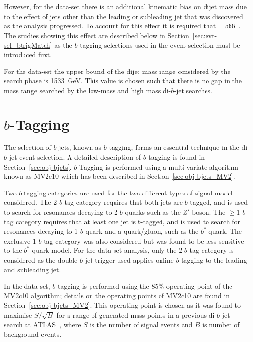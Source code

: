 However, for the \lm{} data-set
there is an additional kinematic bias on dijet mass 
due to the effect of jets other than the leading or subleading jet
that was discovered as the analysis progressed.
To account for this effect it is required that \mjj{}~\gt{}~566~\GeV{}.
The studies showing this effect are described below in Section~\ref{sec:evt-sel_btrigMatch}
as the $b$-tagging selections used in the \lm{} event selection must be introduced first.

For the \lm{} data-set the upper bound of the dijet mass range considered by the search phase is 1533~GeV.
This value is chosen such that there is no gap in the mass range searched by the low-mass and high mass di-$b$-jet searches.

\section{$b$-Tagging}
\label{sec:evt-sel-btag}

The selection of $b$-jets, known as $b$-tagging,
forms an essential technique in the di-$b$-jet event selection.
A detailed description of $b$-tagging is found in Section~\ref{sec:obj-bjets}.
$b$-Tagging is performed using a multi-variate algorithm known as MV2c10 which has been described in Section~\ref{sec:obj-bjets_MV2}.

Two $b$-tagging categories are used for the two different types of signal model considered.
The 2 $b$-tag category requires that both jets are $b$-tagged,
and is used to search for resonances decaying to 2 $b$-quarks such as the $Z'$ boson.
The $\geq 1$ $b$-tag category requires that at least one jet is $b$-tagged,
and is used to search for resonances decaying to 1 $b$-quark and a quark/gluon, such as the $b^*$ quark.
The exclusive 1 $b$-tag category was also considered but was found to be less sensitive to the $b^*$ quark model.
For the \lm{} data-set analysis, only the 2 $b$-tag category is considered
as the double $b$-jet trigger used applies online $b$-tagging to the leading and subleading jet.

In the \summer{} data-set,
$b$-tagging is performed using the 85\% operating point of the MV2c10 algorithm;
details on the operating points of MV2c10 are found in Section~\ref{sec:obj-bjets_MV2}.
This operating point is chosen as it was found to maximise $S/\sqrt{B}$ for a range of generated mass points
in a previous di-$b$-jet search at ATLAS~\cite{dibjet-mori16_paper},
where $S$ is the number of signal events and $B$ is number of background events.

